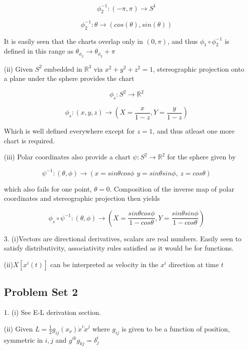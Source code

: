 \documentclass{article}
\begin{document}
\medskip

$$
\phi_2^{-1}: (-\pi ,\pi )\rightarrow S^1
$$

\vspace{-.3cm}

$$
\phi_2^{-1}: \theta \rightarrow (cos(\theta ),sin(\theta ))
$$

It is easily seen that the charts overlap only in $(0,\pi )$, and thus $\phi_1\circ\phi_2^{-1}$ is defined in this range as $\theta_{\phi_2}\rightarrow\theta_{\phi_2}+\pi$

(ii) Given $S^2$ embedded in $\mathbb{R}^3$ via $x^2+y^2+z^2=1$, stereographic projection onto a plane under the sphere provides the chart

 $$\phi_s:S^2\rightarrow \mathbb{R}^2$$

 $$\phi_s:(x,y,z)\rightarrow (X=\frac{x}{1-z},Y=\frac{y}{1-z})
 $$
 
Which is well defined everywhere except for $z=1$, and thus atleast one more chart is required.

(iii) Polar coordinates also provide a chart $\psi:S^2\rightarrow \mathbb{R}^2$ for the sphere given by 

$$
\psi^{-1}: (\theta ,\phi)\rightarrow(x=sin\theta cos\phi\,\ y=sin\theta sin\phi, \ z=cos\theta)
$$

which also fails for one point, $\theta=0$. Composition of the inverse map of polar coordinates and stereographic projection then yields

$$
\phi_s\circ\psi^{-1} :(\theta,\phi)\rightarrow (X=\frac{sin\theta cos\phi}{1-cos\theta},Y=\frac{sin\theta sin\phi}{1-cos\theta})
$$

3. (i)Vectors are directional derivatives, scalars are real numbers. Easily seen to satisfy distributivity, associativity rules satisfied as it would be for functions.

(ii)$X[x^i(t)]$ can be interpreted as velocity in the $x^i$ direction at time $t$

\pagebreak

\subsection{Problem Set 2}

1. (i) See E-L derivation section. %

(ii) Given $L=\frac{1}{2}g_{ij}(x_{\nu})\dot{x}^i\dot{x}^j$ where $g_{ij}$ is given to be a function of position, symmetric in $i,j$ and $g^{ik}g_{kj}=\delta^i_j$
\end{document}
